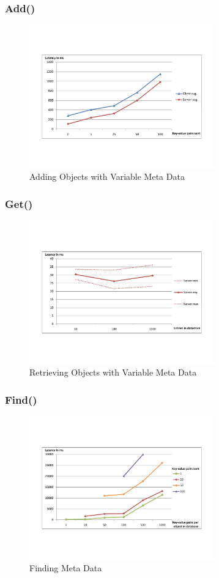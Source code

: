 \documentclass{beamer}
\begin{document}
\frame
{
	\frametitle{Add()}
	\begin{figure}[t]
	\begin{center}
	\includegraphics[trim=4cm 4cm 4cm 5cm, width=8cm]{add_md.pdf} 
	\caption{Adding Objects with Variable Meta Data}
	\end{center}
	\end{figure}
}

\frame
{
	\frametitle{Get()}
	\begin{figure}[t]
	\begin{center}
	\includegraphics[trim=4cm 4cm 4cm 5cm, width=8cm]{get_amt.pdf} 
	\caption{Retrieving Objects with Variable Meta Data}
	\end{center}
	\end{figure}
}

\frame
{
	\frametitle{Find()}
	\begin{figure}[t]
	\begin{center}
	\includegraphics[trim=4cm 4cm 4cm 5cm, width=8cm]{find_amt.pdf} 
	\caption{Finding Meta Data}
	\end{center}
	\end{figure}
}
\end{document}

